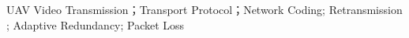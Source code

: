 
\eabstract
{
	
}
{UAV Video Transmission；Transport Protocol；Network Coding;  Retransmission ; Adaptive Redundancy; Packet Loss}	%